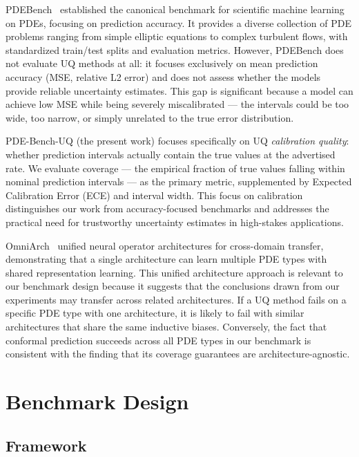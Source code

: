 \documentclass[12pt,a4paper]{article}
\theoremstyle{plain}
\begin{document}
PDEBench~\citep{takamoto2022pdebench} established the canonical benchmark for
scientific machine learning on PDEs, focusing on prediction accuracy.
It provides a diverse collection of PDE problems ranging from simple
elliptic equations to complex turbulent flows, with standardized train/test
splits and evaluation metrics. However, PDEBench does not evaluate UQ methods
at all: it focuses exclusively on mean prediction accuracy (MSE, relative L2
error) and does not assess whether the models provide reliable uncertainty
estimates. This gap is significant because a model can achieve low MSE
while being severely miscalibrated --- the intervals could be too wide, too
narrow, or simply unrelated to the true error distribution.

PDE-Bench-UQ (the present work) focuses specifically on UQ \emph{calibration quality}:
whether prediction intervals actually contain the true values at the advertised rate.
We evaluate coverage --- the empirical fraction of true values falling within
nominal prediction intervals --- as the primary metric, supplemented by
Expected Calibration Error (ECE) and interval width. This focus on
calibration distinguishes our work from accuracy-focused benchmarks and
addresses the practical need for trustworthy uncertainty estimates in
high-stakes applications.

OmniArch~\citep{wang2023omniarch} unified neural operator architectures
for cross-domain transfer, demonstrating that a single architecture can
learn multiple PDE types with shared representation learning. This unified
architecture approach is relevant to our benchmark design because it suggests
that the conclusions drawn from our experiments may transfer across related
architectures. If a UQ method fails on a specific PDE type with one
architecture, it is likely to fail with similar architectures that share
the same inductive biases. Conversely, the fact that conformal prediction
succeeds across all PDE types in our benchmark is consistent with the finding
that its coverage guarantees are architecture-agnostic.

\section{Benchmark Design}
\label{sec:benchmark}

\subsection{Framework}
\end{document}
